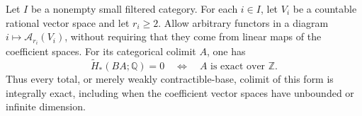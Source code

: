 \begin{theorem}
\label{C4:acyclic-cocycle-colimits}\label{C4:vector-cocycle-colimits}
Let $I$ be a nonempty small filtered category. For each $i\in I$,
let $V_i$ be a countable rational vector space and let $r_i\geq2$.
Allow arbitrary functors in a diagram
$i\mapsto\mathcal A_{r_i}(V_i)$, without requiring that they come
from linear maps of the coefficient spaces. For its categorical
colimit $A$, one has
\[
 \widetilde H_*(BA;\mathbb Q)=0
 \quad\Longleftrightarrow\quad
 A\text{ is exact over }\mathbb Z.
\]
Thus every total, or merely weakly contractible-base, colimit of
this form is integrally exact, including when the coefficient vector
spaces have unbounded or infinite dimension.
\end{theorem}
